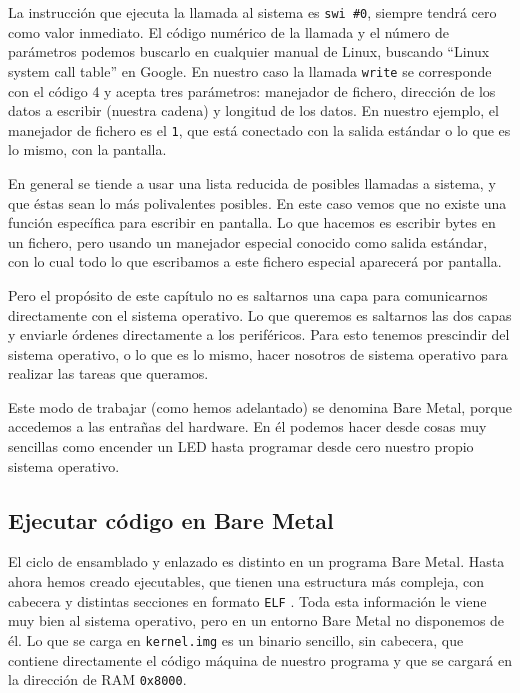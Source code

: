 La instrucción que ejecuta la llamada al sistema es {\tt swi \#0},
siempre tendrá cero como valor inmediato. El código numérico de
la llamada y el número de parámetros podemos buscarlo en cualquier
manual de Linux, buscando ``Linux system call table'' en Google. En
nuestro caso la llamada {\tt write} se corresponde con el código
4 y acepta tres parámetros: manejador de fichero, dirección de
los datos a escribir (nuestra cadena) y longitud de los datos. En
nuestro ejemplo, el manejador de fichero es el {\tt 1}, que está
conectado con la salida estándar o lo que es lo mismo, con la pantalla.

En general se tiende a usar una lista reducida de posibles llamadas
a sistema, y que éstas sean lo más polivalentes posibles. En este
caso vemos que no existe una función específica para escribir en
pantalla. Lo que hacemos es escribir bytes en un fichero, pero usando
un manejador especial conocido como salida estándar, con lo cual todo
lo que escribamos a este fichero especial aparecerá por pantalla.

Pero el propósito de este capítulo no es saltarnos una capa
para comunicarnos directamente con el sistema operativo. Lo que queremos
es saltarnos las dos capas y enviarle órdenes directamente a los periféricos.
Para esto tenemos prescindir del sistema operativo, o lo que es lo mismo,
hacer nosotros de sistema operativo para realizar las tareas que queramos.

Este modo de trabajar (como hemos adelantado) se denomina Bare Metal, porque
accedemos a las entrañas del hardware. En él podemos hacer desde cosas
muy sencillas como encender un LED hasta programar desde cero nuestro propio
sistema operativo.

\subsection{Ejecutar código en Bare Metal}
\label{sec:Ejecutar}

El ciclo de ensamblado y enlazado es distinto en un programa Bare Metal. Hasta
ahora hemos creado ejecutables, que tienen una estructura más compleja, con cabecera y
distintas secciones en formato {\tt ELF} \cite{FELF}. Toda esta información le viene muy bien al
sistema operativo, pero en un entorno Bare Metal no disponemos de él. Lo que se carga
en {\tt kernel.img} es un binario sencillo, sin cabecera, que contiene directamente
el código máquina de nuestro programa y que se cargará en la dirección de RAM {\tt 0x8000}.


